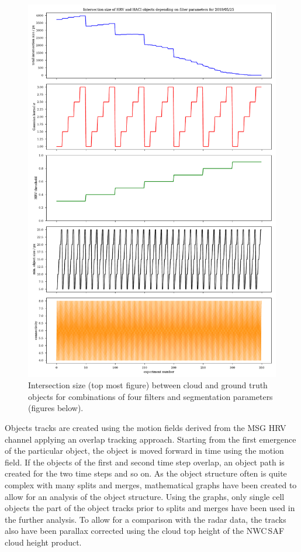 \begin{figure}[htbp]
\centering
\includegraphics[height=\textheight]{Grafiken/Abbildungen/parameter_plot.pdf}
\caption{Intersection size (top most figure) between cloud and ground truth objects for combinations of four filters and segmentation parameters (figures below).}
\label{fig:filter-parameters}
\end{figure}

Objects tracks are created using the motion fields derived from the MSG HRV channel applying an overlap tracking approach. Starting from the first emergence of the particular object, the object is moved forward in time using the motion field. If the objects of the first and second time step overlap, an object path is created for the two time steps and so on. As the object structure often is quite complex with many splits and merges, mathematical graphs have been created to allow for an analysis of the object structure. Using the graphs, only single cell objects the part of the object tracks prior to splits and merges have been used in the further analysis. To allow for a comparison with the radar data, the tracks also have been parallax corrected using the cloud top height of the NWC\,SAF cloud height product.

